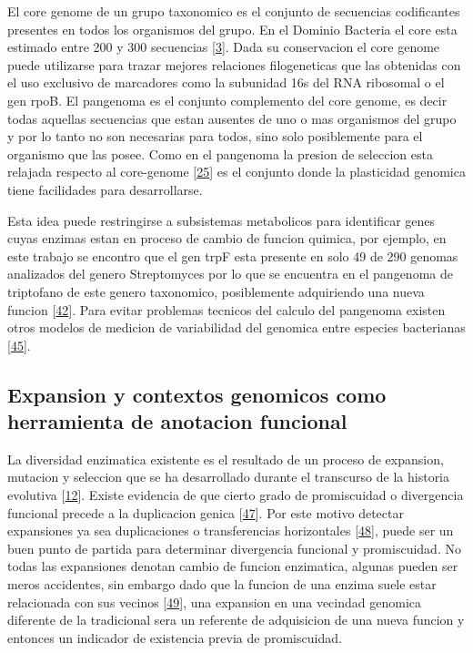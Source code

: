 \documentclass[12pt,twoside]{reedthesis}
\begin{document}
  El core genome de un grupo taxonomico es el conjunto de secuencias
  codificantes presentes en todos los organismos del grupo. En el Dominio
  Bacteria el core esta estimado entre 200 y 300 secuencias
  {[}\protect\hyperlink{ref-halachev_calculating_2011}{3}{]}. Dada su
  conservacion el core genome puede utilizarse para trazar mejores
  relaciones filogeneticas que las obtenidas con el uso exclusivo de
  marcadores como la subunidad 16s del RNA ribosomal o el gen rpoB. El
  pangenoma es el conjunto complemento del core genome, es decir todas
  aquellas secuencias que estan ausentes de uno o mas organismos del grupo
  y por lo tanto no son necesarias para todos, sino solo posiblemente para
  el organismo que las posee. Como en el pangenoma la presion de seleccion
  esta relajada respecto al core-genome
  {[}\protect\hyperlink{ref-firn_darwinian_2009}{25}{]} es el conjunto
  donde la plasticidad genomica tiene facilidades para desarrollarse.
  
  Esta idea puede restringirse a subsistemas metabolicos para identificar
  genes cuyas enzimas estan en proceso de cambio de funcion quimica, por
  ejemplo, en este trabajo se encontro que el gen trpF esta presente en
  solo 49 de 290 genomas analizados del genero Streptomyces por lo que se
  encuentra en el pangenoma de triptofano de este genero taxonomico,
  posiblemente adquiriendo una nueva funcion
  {[}\protect\hyperlink{ref-ma_unconventional_2013}{42}{]}. Para evitar
  problemas tecnicos del calculo del pangenoma existen otros modelos de
  medicion de variabilidad del genomica entre especies bacterianas
  {[}\protect\hyperlink{ref-kislyuk_genomic_2011}{45}{]}.
  
  \subsection{Expansion y contextos genomicos como herramienta de
  anotacion
  funcional}\label{expansion-y-contextos-genomicos-como-herramienta-de-anotacion-funcional}
  
  La diversidad enzimatica existente es el resultado de un proceso de
  expansion, mutacion y seleccion que se ha desarrollado durante el
  transcurso de la historia evolutiva
  {[}\protect\hyperlink{ref-khersonsky_enzyme_2010}{12}{]}. Existe
  evidencia de que cierto grado de promiscuidad o divergencia funcional
  precede a la duplicacion genica
  {[}\protect\hyperlink{ref-hughes_evolution_1994}{47}{]}. Por este motivo
  detectar expansiones ya sea duplicaciones o transferencias horizontales
  {[}\protect\hyperlink{ref-treangen_horizontal_2011}{48}{]}, puede ser un
  buen punto de partida para determinar divergencia funcional y
  promiscuidad. No todas las expansiones denotan cambio de funcion
  enzimatica, algunas pueden ser meros accidentes, sin embargo dado que la
  funcion de una enzima suele estar relacionada con sus vecinos
  {[}\protect\hyperlink{ref-overbeek_use_1999}{49}{]}, una expansion en
  una vecindad genomica diferente de la tradicional sera un referente de
  adquisicion de una nueva funcion y entonces un indicador de existencia
  previa de promiscuidad.
  
\end{document}
